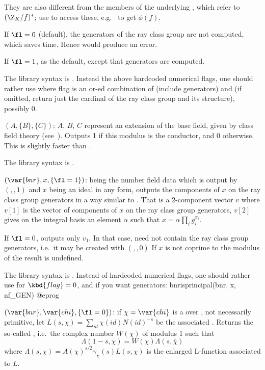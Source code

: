 They are also different from the members of the underlying , which
refer to $(\Z_K/f)^*$; use  to access these,
e.g.~ to get $\phi(f)$.

If $\fl=0$ (default), the generators of the ray class group are not computed,
which saves time. Hence  would produce an error.

If $\fl=1$, as the default, except that generators are computed.

The library syntax is .
Instead the above  hardcoded  numerical flags,  one should rather use
where flag is an or-ed combination of  (include generators)
and  (if omitted, return just the cardinal of the ray class group
and its structure), possibly 0.

$(A,\{B\},\{C\})$: \label{se:bnrisconductor}$A$, $B$, $C$ represent
an extension of the base field, given by class field theory
(see~). Outputs 1 if this modulus is the conductor, and 0
otherwise. This is slightly faster than .

The library syntax is .

$(\var{bnr},x,\{\fl=1\})$: \label{se:bnrisprincipal} being the
number field data which is output by $(,,1)$ and $x$ being an
ideal in any form, outputs the components of $x$ on the ray class group
generators in a way similar to . That is a 2-component
vector $v$ where $v[1]$ is the vector of components of $x$ on the ray class
group generators, $v[2]$ gives on the integral basis an element $\alpha$ such
that $x=\alpha\prod_ig_i^{x_i}$.

If $\fl=0$, outputs only $v_1$. In that case,  need not contain the
ray class group generators, i.e.~it may be created with $(,,0)$
If $x$ is not coprime to the modulus of  the result is undefined.

The library syntax is .
Instead of hardcoded  numerical flags,  one should rather
use
 for $\kbd{flag} = 0$, and if you
want generators:
\bprog
  bnrisprincipal(bnr, x, nf_GEN)
@eprog

$(\var{bnr},\var{chi},\{\fl=0\})$: \label{se:bnrrootnumber}if $\chi=\var{chi}$ is a
 over , not necessarily primitive, let
$L(s,\chi) = \sum_{id} \chi(id) N(id)^{-s}$ be the associated
. Returns the so-called , i.e.~the
complex number $W(\chi)$ of modulus 1 such that
%
$$\Lambda(1-s,\chi) = W(\chi) \Lambda(s,\overline{\chi})$$
%
\noindent where $\Lambda(s,\chi) = A(\chi)^{s/2}\gamma_\chi(s) L(s,\chi)$ is
the enlarged L-function associated to $L$.

